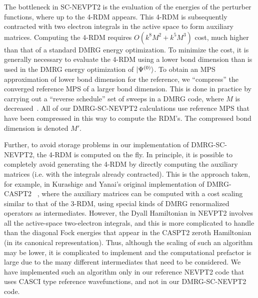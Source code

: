 The bottleneck in SC-NEVPT2 is the evaluation of the energies of the perturber functions, 
where up to the 4-RDM appears. This 4-RDM is subsequently contracted with 
two electron integrals in the active space to form auxiliary matrices.\cite{ angeli_n-electron_2002} 
Computing the 4-RDM requires $O(k^8M^2+k^5M^3)$ cost, much higher than that of a standard DMRG energy optimization.
To minimize the cost, it is generally necessary to evaluate the 4-RDM using a lower bond dimension than is used in the DMRG energy optimization of $\ket{\Psi^{(0)}}$.
To obtain an MPS approximation of lower bond dimension for the reference, 
we  ``compress'' the converged reference MPS of a larger bond dimension.
 This is done in practice by carrying out a ``reverse schedule'' set of sweeps
in a DMRG code, where $M$ is decreased~\cite{olivares-amaya_ab-initio_2015}. All of our DMRG-SC-NEVPT2 calculations use reference MPS that have been 
compressed in this way to compute the RDM's. The compressed bond dimension is
denoted $M'$.

Further, to avoid storage problems in our implementation of DMRG-SC-NEVPT2, 
the 4-RDM is computed on the fly. In principle, it is possible to 
completely avoid generating the 4-RDM by directly computing the auxiliary matrices (i.e. with the integrals already contracted). 
This is the approach taken, for example, in Kurashige and Yanai's original implementation of DMRG-CASPT2
~\cite{kurashige_second-order_2011}, where the auxiliary matrices can be computed with a cost scaling similar to that of the 3-RDM,
using special kinds of DMRG renormalized operators as intermediates. However, the Dyall Hamiltonian in NEVPT2 
involves all the active-space two-electron integrals, and this is more complicated to handle than the diagonal Fock energies that appear in the CASPT2 zeroth 
Hamiltonian (in its canonical representation). Thus, although the scaling of such an algorithm may be lower, it is complicated to implement
and the computational prefactor is large due to the many different intermediates that need to be considered. We have implemented
such an algorithm only in our reference NEVPT2 code that uses CASCI type reference wavefunctions, and not in our DMRG-SC-NEVPT2 code.





